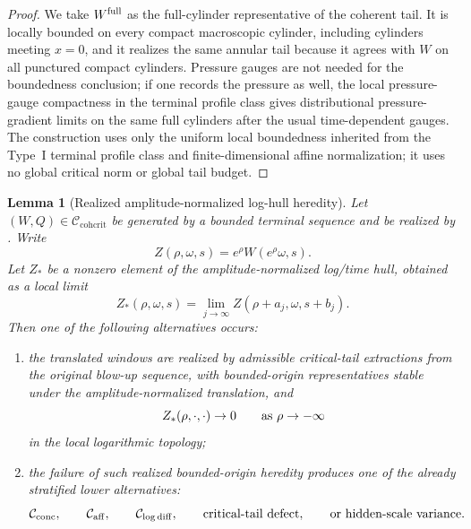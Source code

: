 \documentclass[11pt]{amsart}
\numberwithin{equation}{section}
\theoremstyle{plain}
\newtheorem{lemma}[lemma]{Lemma}
\theoremstyle{definition}
\theoremstyle{remark}
\newcommand{\Cactive}{\mathcal C_{\mathrm{conc}}}
\newcommand{\Caff}{\mathcal C_{\mathrm{aff}}}
\newcommand{\Ccohcrit}{\mathcal C_{\mathrm{cohcrit}}}
\newcommand{\Clogdiff}{\mathcal C_{\log\mathrm{diff}}}
\begin{document}
\begin{proof}
We take \(W^{\rm full}\) as the full-cylinder representative of the coherent
tail.  It is locally bounded on every compact macroscopic cylinder, including
cylinders meeting \(x=0\), and it realizes the same annular tail because it
agrees with \(W\) on all punctured compact cylinders.  Pressure gauges are not
needed for the boundedness conclusion; if one records the pressure as well, the
local pressure-gauge compactness in the terminal profile class gives
distributional pressure-gradient limits on the same full cylinders after the
usual time-dependent gauges.  The construction uses only the uniform local
boundedness inherited from the Type~I terminal profile class and finite-dimensional
affine normalization; it uses no global critical norm or global tail budget.
\end{proof}

\begin{lemma}[Realized amplitude-normalized log-hull heredity]
\label{lem:realized-amplitude-log-hull-heredity}
Let \((W,Q)\in\Ccohcrit\) be generated by a bounded terminal sequence and be
realized by .  Write
\[
   Z(\rho,\omega,s)=e^\rho W(e^\rho\omega,s).
\]
Let \(Z_*\) be a nonzero element of the amplitude-normalized log/time hull,
obtained as a local limit
\[
   Z_*(\rho,\omega,s)
   =
   \lim_{j\to\infty}Z(\rho+a_j,\omega,s+b_j).
\]
Then one of the following alternatives occurs:
\begin{enumerate}[label=\textup{(\roman*)}]
   \item the translated windows are realized by admissible critical-tail
   extractions from the original blow-up sequence, with bounded-origin
   representatives stable under the amplitude-normalized translation, and
   \[
      Z_*(\rho,\cdot,\cdot)\to0
      \qquad\hbox{as }\rho\to-\infty
   \]
   in the local logarithmic topology;
   \item the failure of such realized bounded-origin heredity produces one of
   the already stratified lower alternatives:
   \[
      \Cactive,\qquad \Caff,\qquad \Clogdiff,\qquad
      \hbox{critical-tail defect},\qquad
      \hbox{or hidden-scale variance}.
   \]
\end{enumerate}
\end{lemma}
\end{document}
